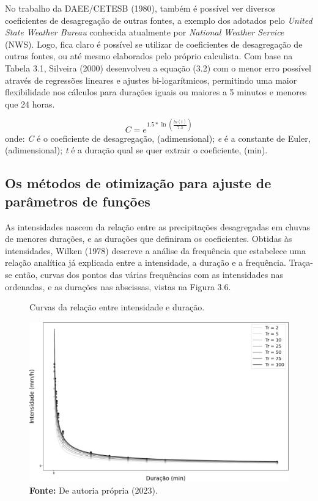 \newpage

No trabalho da DAEE/CETESB (1980), também é possível ver diversos coeficientes de desagregação de outras fontes, a exemplo dos adotados pelo \textit{United State Weather Bureau} conhecida atualmente por \textit{National Weather Service} (NWS). Logo, fica claro é possível se utilizar de coeficientes de desagregação de outras fontes, ou até mesmo elaborados pelo próprio calculista. Com base na Tabela 3.1, Silveira (2000) desenvolveu a equação (3.2) com o menor erro possível através de regressões lineares e ajustes bi-logarítmicos, permitindo uma maior flexibilidade nos cálculos para durações iguais ou maiores a 5 minutos e menores que 24 horas.\bigskip

\begin{equation}
C = e^{1.5 * \ln{\left(\frac{ln{\left(t\right)}}{7.3}\right)}}
\end{equation}
\newline
onde:
\newline
\textit{C} é o coeficiente de desagregação, (adimensional);
\newline
\textit{e} é a constante de Euler, (adimensional);
\newline
\textit{t} é a duração qual se quer extrair o coeficiente, (min).\bigskip

\subsection{Os métodos de otimização para ajuste de parâmetros de funções}

As intensidades nascem da relação entre as precipitações desagregadas em chuvas de menores durações, e as durações que definiram os coeficientes. Obtidas às intensidades, Wilken (1978) descreve a análise da frequência que estabelece uma relação analítica já explicada entre a intensidade, a duração e a frequência. Traça-se então, curvas dos pontos das várias frequências com as intensidades nas ordenadas, e as durações nas abscissas, vistas na Figura 3.6.\bigskip

\begin{figure}[!ht]
	\centering
	\caption{Curvas da relação entre intensidade e duração.}
	\includegraphics[width=.7325\linewidth]{figuras/curvas_idf_de_intensidade_e_duracao.png}
	\caption*{\textbf{Fonte:} De autoria própria (2023).}
	\label{fig:curvas_idf_de_intensidade_e_duracao.png}
\end{figure}

